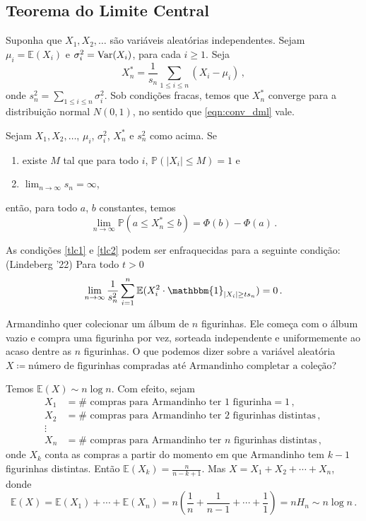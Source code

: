 \subsection{Teorema do Limite Central}

Suponha que $X_1, X_2, \dotsc$ são variáveis aleatórias independentes. Sejam $\mu_i = \mathbb{E}(X_i)$ e $\sigma_i^2 = \operatorname{Var}(X_i)$, para cada $i\geq1$. Seja 
\[
	X_n^{*} = \frac{1}{s_n}\sum_{1\leq i\leq n}(X_i - \mu_i)\,,
\]
onde $s_n^2 = \sum_{1\leq i\leq n}\sigma_i^2$. Sob condições fracas, temos que $X_n^{*}$ converge para a distribuição normal $N(0,1)$, no sentido que \eqref{eqn:conv_dml} vale.

\begin{teorema}
	Sejam $X_1, X_2, \dotsc$, $\mu_i$, $\sigma_i^2$, $X_n^{*}$ e $s_n^2$ como acima.
	Se 
	\begin{enumerate}[label = \rmlabel]
		\item \label{tlc1} existe $M$ tal que para todo $i$, $\mathbb{P}(|X_i|\leq M) = 1$ e 
		\item \label{tlc2} $\lim_{n\rightarrow\infty}s_n = \infty$,
	\end{enumerate}
	então, para todo $a$, $b$ constantes, temos
	\[
	\lim_{n\rightarrow\infty}\mathbb{P}(a\leq X_n^{*}\leq b) = \Phi(b) - \Phi(a)\,.
	\]
\end{teorema}

As condições  \ref{tlc1} e \ref{tlc2} podem ser enfraquecidas para a seguinte condição:
\newline
(Lindeberg '22) Para todo $t>0$
\[
	\lim_{n\rightarrow\infty}\frac{1}{s_n^2}\sum_{i=1}^{n}\mathbb{E}(X_i^2\cdot\mathbbm{1}_{|X_i|\geq ts_n}) = 0\,.
\]
\begin{exemplo}
	Armandinho quer colecionar um álbum de $n$ figurinhas. Ele começa com o álbum vazio e compra uma figurinha por vez, sorteada independente e uniformemente ao acaso dentre as $n$ figurinhas. O que podemos dizer sobre a variável aleatória $X\coloneqq\text{número de figurinhas compradas até Armandinho completar a coleção}$?
	
	Temos $\mathbb{E}(X) \sim n\log n$. Com efeito, sejam
	\begin{align*}
	X_1 &= \# \text{ compras para Armandinho ter 1 figurinha} = 1\,,\\
	X_2 &= \# \text{ compras para Armandinho ter 2 figurinhas distintas}\,,\\
	\vdots\\
	X_n &= \# \text{ compras para Armandinho ter $n$ figurinhas distintas}\,,
	\end{align*}
	onde $X_k$ conta as compras a partir do momento em que Armandinho tem $k-1$ figurinhas distintas. Então $\mathbb{E}(X_k) = \frac{n}{n-k+1}$. Mas $X = X_1 + X_2 + \dotsb + X_n$, donde
	\[
	\mathbb{E}(X) = \mathbb{E}(X_1) + \dotsb + \mathbb{E}(X_n) = n\left(\frac{1}{n} + \frac{1}{n-1} + \dotsb + \frac{1}{1}\right) = nH_n\sim n\log n\,.
	\]
	
\end{exemplo}

